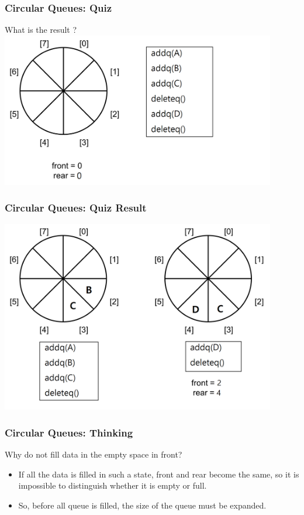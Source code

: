 \documentclass[newPxFont,sthlmFooter,nooffset]{beamer}
\begin{document}
\begin{frame}[t]
	\frametitle{Circular Queues: Quiz}
What is the result ?
	\includegraphics[width=0.9\textwidth]{figures/fig05_quiz1.png}
\end{frame}
\begin{frame}[t]
	\frametitle{Circular Queues: Quiz Result}
	\includegraphics[width=0.9\textwidth]{figures/fig05_quiz2.png}
\end{frame}

\begin{frame}[t, fragile]
	\frametitle{Circular Queues: Thinking}
	Why do not fill data in the empty space in front?

\begin{itemize}
	\item If all the data is filled in such a state, front and rear become the same, so it is impossible to distinguish whether it is empty or full.
	\item So, before all queue is filled, the size of the queue must be expanded.
\end{itemize}

\end{frame}
\end{document}
